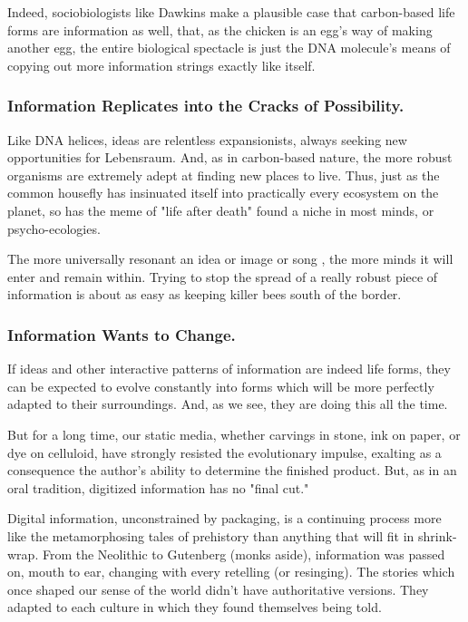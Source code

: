 \documentclass[
]{article}
\begin{document}
Indeed, sociobiologists like Dawkins make a plausible case that
carbon-based life forms are information as well, that, as the chicken is
an egg's way of making another egg, the entire biological spectacle is
just the DNA molecule's means of copying out more information strings
exactly like itself.

\hypertarget{header-n272}{%
\subsubsection{Information Replicates into the Cracks of
Possibility.}\label{header-n272}}

Like DNA helices, ideas are relentless expansionists, always seeking new
opportunities for Lebensraum. And, as in carbon-based nature, the more
robust organisms are extremely adept at finding new places to live.
Thus, just as the common housefly has insinuated itself into practically
every ecosystem on the planet, so has the meme of "life after death"
found a niche in most minds, or psycho-ecologies.

The more universally resonant an idea or image or song , the more minds
it will enter and remain within. Trying to stop the spread of a really
robust piece of information is about as easy as keeping killer bees
south of the border.

\hypertarget{header-n275}{%
\subsubsection{Information Wants to Change.}\label{header-n275}}

If ideas and other interactive patterns of information are indeed life
forms, they can be expected to evolve constantly into forms which will
be more perfectly adapted to their surroundings. And, as we see, they
are doing this all the time.

But for a long time, our static media, whether carvings in stone, ink on
paper, or dye on celluloid, have strongly resisted the evolutionary
impulse, exalting as a consequence the author's ability to determine the
finished product. But, as in an oral tradition, digitized information
has no "final cut."

Digital information, unconstrained by packaging, is a continuing process
more like the metamorphosing tales of prehistory than anything that will
fit in shrink-wrap. From the Neolithic to Gutenberg (monks aside),
information was passed on, mouth to ear, changing with every retelling
(or resinging). The stories which once shaped our sense of the world
didn't have authoritative versions. They adapted to each culture in
which they found themselves being told.
\end{document}
